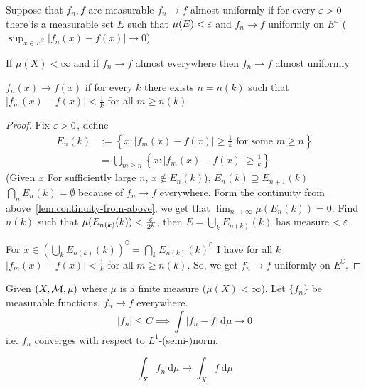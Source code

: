 \begin{definition}
  Suppose that $f_n, f$ are measurable
  $f_n \to f$ almost uniformly if for every $\varepsilon > 0$
  there is a measurable set $E$ such that $\mu(E) < \varepsilon$ and $f_n \to f$ uniformly on $E^\complement$
  ($\sup_{x\in E^\complement} |f_n(x) - f(x)| \to 0$)
\end{definition}

\begin{theorem}
  If $\mu(X) < \infty$ and if $f_n \to f$ almost everywhere then 
  $f_n \to f$ almost uniformly
\end{theorem}

\begin{remark}
  $f_n(x) \to f(x)$ if for every $k$ there exists $n = n(k)$ such that
  $|f_m(x) - f(x)| < \frac1k$ for all $m \ge n(k)$
\end{remark}

\begin{proof}
  Fix $\varepsilon > 0$, define 
  \begin{align*}
    E_n(k) &:= \left\{x : |f_m(x) - f(x)| \ge \frac1k \text{ for some }m \ge n\right\} \\
    &= \bigcup_{m \ge n} \left\{x : |f_m(x) - f(x)| \ge \frac1k\right\}
  \end{align*}
  (Given $x$ For sufficiently large $n$, $x \notin E_n(k)$), $E_n(k) \supseteq E_{n+1}(k)$
  $\bigcap_n E_n(k) = \emptyset$ because of $f_n \to f$ everywhere.
  Form the continuity from above~\ref{lem:continuity-from-above}, we get that $\lim_{n\to\infty}\mu(E_n(k)) = 0$.
  Find $n(k)$ such that $\mu(E_{n(k)}(k)) < \frac{\varepsilon}{2^k}$, then $E = \bigcup_k E_{n(k)}(k)$ has measure $< \varepsilon$.
  
  For $x\in \left(\bigcup_k E_{n(k)}(k)\right)^\complement = \bigcap_k E_{n(k)}(k)^\complement$
  I have for all $k$ $|f_m(x) - f(x)| < \frac1k$ for all $m \ge n(k)$.
  So, we get $f_n \to f$ uniformly on $E^\complement$.
\end{proof}

\begin{theorem}
  Given $(X, \mathcal M, \mu)$ where $\mu$ is a finite measure ($\mu(X) < \infty$).
  Let $\{f_n\}$ be measurable functions, $f_n \to f$ everywhere.
  \[|f_n| \le C \implies \int |f_n - f| \ \mathrm{d}\mu \to 0\]
  i.e. $f_n$ converges with respect to $L^1$-(semi-)norm.
\end{theorem}

\begin{corollary}
  \[\int_X f_n\ \mathrm{d}\mu \to \int_X f \ \mathrm{d}\mu\]
\end{corollary}

